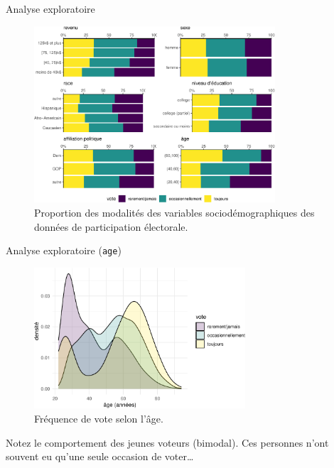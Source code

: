 \documentclass[
  ignorenonframetext,
]{beamer}
\begin{document}
\begin{frame}{Analyse exploratoire}
\protect\hypertarget{analyse-exploratoire}{}
\begin{figure}

{\centering \includegraphics[width=0.8\textwidth,height=\textheight]{MATH60602-diapos8_files/figure-beamer/fig-multinom_means-Ipsos-1.pdf}

}

\caption{\label{fig-multinom_means-Ipsos}Proportion des modalités des
variables sociodémographiques des données de participation électorale.}

\end{figure}
\end{frame}

\begin{frame}{Analyse exploratoire (\texttt{age})}
\protect\hypertarget{analyse-exploratoire-age}{}
\begin{figure}

{\centering \includegraphics[width=0.7\textwidth,height=\textheight]{MATH60602-diapos8_files/figure-beamer/fig-vote-age-1.pdf}

}

\caption{\label{fig-vote-age}Fréquence de vote selon l'âge.}

\end{figure}

Notez le comportement des jeunes voteurs (bimodal). Ces personnes n'ont
souvent eu qu'une seule occasion de voter\ldots{}
\end{frame}
\end{document}

